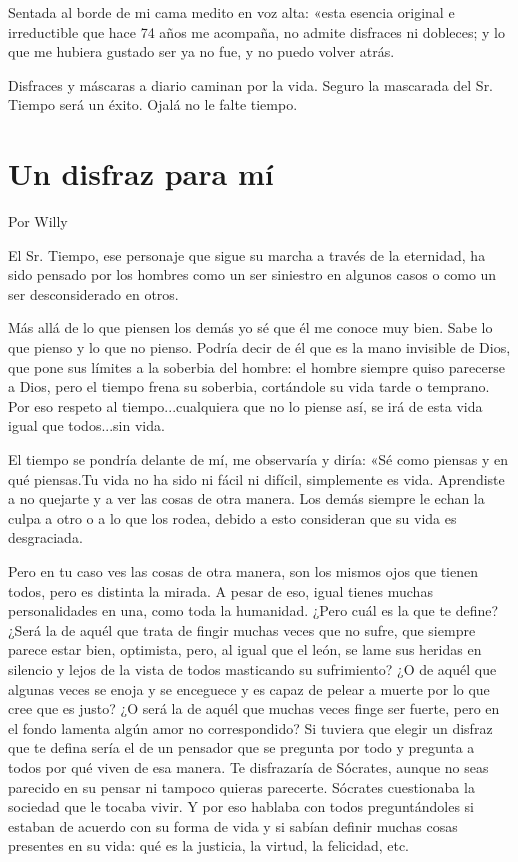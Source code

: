 \documentclass[11pt,twoside,openright,a5paper]{book}
\begin{document}
Sentada al borde de mi cama medito en voz alta: «esta esencia original e irreductible que hace 74 años me acompaña, no admite disfraces ni dobleces; y lo que me hubiera gustado ser ya no fue, y no puedo volver atrás.

Disfraces y máscaras a diario caminan por la vida. Seguro la mascarada del Sr. Tiempo será un éxito. Ojalá no le falte tiempo.

\section*{Un disfraz para mí}

                                                                                   \begin{flushright}Por Willy\end{flushright}

El Sr. Tiempo, ese personaje que sigue su marcha a través de la eternidad, ha sido pensado por los hombres como un ser siniestro en algunos casos o como un ser desconsiderado en otros. 

Más allá de lo que piensen los demás yo sé que él me conoce muy bien. Sabe lo que pienso y lo que no pienso. Podría decir de él que es la mano invisible de Dios, que pone sus límites a la soberbia del hombre: el hombre siempre quiso parecerse a Dios, pero el tiempo frena su soberbia, cortándole su vida tarde o temprano. Por eso respeto al tiempo...cualquiera que no lo piense así, se irá de esta vida igual que todos...sin vida.

El tiempo se pondría delante de mí, me observaría y diría: «Sé como piensas y en qué piensas.Tu vida no ha sido ni fácil ni difícil, simplemente es vida. Aprendiste a no quejarte y a ver las cosas de otra manera. Los demás siempre le echan la culpa a otro o a lo que los rodea, debido a esto consideran que su vida es desgraciada.

Pero en tu caso ves las cosas de otra manera, son los mismos ojos que tienen todos, pero es distinta la mirada. A pesar de eso, igual tienes muchas personalidades en una, como toda la humanidad. ¿Pero cuál es la que te define? ¿Será la de aquél que trata de fingir muchas veces que no sufre, que siempre parece estar bien, optimista, pero, al igual que el león, se lame sus heridas en silencio y lejos de la vista de todos masticando su sufrimiento? ¿O de aquél que algunas veces se enoja y se enceguece y es capaz de pelear a muerte por lo que cree que es justo? ¿O será la de aquél que muchas veces finge ser fuerte, pero en el fondo lamenta algún amor no correspondido? Si tuviera que elegir un disfraz que te defina sería el de un pensador que se pregunta por todo y pregunta a todos por qué viven de esa manera. Te disfrazaría de Sócrates, aunque no seas parecido en su pensar ni tampoco quieras parecerte. Sócrates cuestionaba la sociedad que le tocaba vivir. Y por eso hablaba con todos preguntándoles si estaban de acuerdo con su forma de vida y si sabían definir muchas cosas presentes en su vida: qué es la justicia, la virtud, la felicidad, etc.
\end{document}
